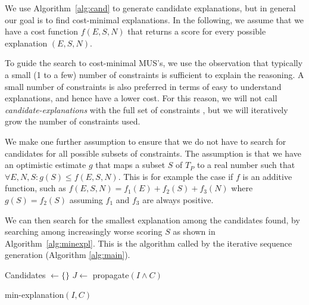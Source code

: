 We use Algorithm~\ref{alg:cand} to generate candidate explanations, but in general our goal is to find cost-minimal explanations. In the following, we assume that we have a cost function $f(E, S, N)$ that returns a score for every possible explanation $(E, S, N)$. 

To guide the search to cost-minimal MUS's, we use the observation that typically a small (1 to a few) number of constraints is sufficient to explain the reasoning. A small number of constraints is also preferred in terms of easy to understand explanations, and hence have a lower cost. For this reason, we will  not call \textit{candidate-explanations} with the full set of constraints \allconstraints, but we will iteratively grow the number of constraints used. 

We make one further assumption to ensure that we do not have to search for candidates for all possible subsets of constraints. The assumption is that we have an optimistic estimate $g$ that maps a subset $S$ of $T_P$ to a real number such that  $\forall E, N, S: g(S) \leq f(E, S, N)$. This is for example the case if $f$ is an additive function, such as $f(E, S, N) = f_1(E) + f_2(S) + f_3(N)$ where $g(S) = f_2(S)$ assuming $f_1$ and $f_3$ are always positive.

We can then search for the smallest explanation among the candidates found, by searching among increasingly worse scoring $S$ as shown in Algorithm~\ref{alg:minexpl}. This is the algorithm called by the iterative sequence generation (Algorithm \ref{alg:main}).

\begin{algorithm}


  Candidates $\gets \{\}$\;
  $J \gets$ propagate$(I \wedge C)$\; 
\caption{min-explanation$(I,C)$}
\label{alg:minexpl}
\end{algorithm}


